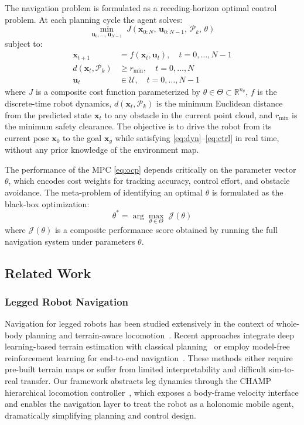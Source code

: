 \documentclass[conference]{IEEEtran}
\begin{document}
The navigation problem is formulated as a receding-horizon optimal control problem. At each planning cycle the agent solves:
\begin{equation}
	\min_{\mathbf{u}_0, \ldots, \mathbf{u}_{N-1}} \; J\!\left(\mathbf{x}_{0:N},\, \mathbf{u}_{0:N-1},\, \mathcal{P}_k,\, \theta\right)
	\label{eq:ocp}
\end{equation}
subject to:
\begin{align}
	\mathbf{x}_{t+1}               & = f(\mathbf{x}_t, \mathbf{u}_t), \quad t = 0, \ldots, N{-}1 \label{eq:dyn} \\
	d(\mathbf{x}_t, \mathcal{P}_k) & \geq r_{\min}, \quad t = 0, \ldots, N \label{eq:obs}                       \\
	\mathbf{u}_t                   & \in \mathcal{U}, \quad t = 0, \ldots, N{-}1 \label{eq:ctrl}
\end{align}
where $J$ is a composite cost function parameterized by $\theta \in \Theta \subset \mathbb{R}^{n_\theta}$, $f$ is the discrete-time robot dynamics, $d(\mathbf{x}_t, \mathcal{P}_k)$ is the minimum Euclidean distance from the predicted state $\mathbf{x}_t$ to any obstacle in the current point cloud, and $r_{\min}$ is the minimum safety clearance. The objective is to drive the robot from its current pose $\mathbf{x}_0$ to the goal $\mathbf{x}_g$ while satisfying \eqref{eq:dyn}--\eqref{eq:ctrl} in real time, without any prior knowledge of the environment map.

The performance of the MPC \eqref{eq:ocp} depends critically on the parameter vector $\theta$, which encodes cost weights for tracking accuracy, control effort, and obstacle avoidance. The meta-problem of identifying an optimal $\theta$ is formulated as the black-box optimization:
\begin{equation}
	\theta^* = \arg\max_{\theta \in \Theta} \; \mathcal{J}(\theta)
	\label{eq:meta}
\end{equation}
where $\mathcal{J}(\theta)$ is a composite performance score obtained by running the full navigation system under parameters $\theta$.

\subsection{Related Work}

\subsubsection{Legged Robot Navigation}
Navigation for legged robots has been studied extensively in the context of whole-body planning and terrain-aware locomotion~\cite{@TODO}. Recent approaches integrate deep learning-based terrain estimation with classical planning~\cite{@TODO} or employ model-free reinforcement learning for end-to-end navigation~\cite{@TODO}. These methods either require pre-built terrain maps or suffer from limited interpretability and difficult sim-to-real transfer. Our framework abstracts leg dynamics through the CHAMP hierarchical locomotion controller~\cite{articleHierarchicalController}, which exposes a body-frame velocity interface and enables the navigation layer to treat the robot as a holonomic mobile agent, dramatically simplifying planning and control design.
\end{document}
